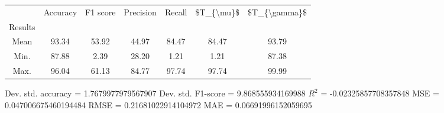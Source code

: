 \begin{tabular}{|c|c|c|c|c|c|c|}
\toprule
{} &  Accuracy &  F1 score &  Precision &  Recall &  \$T\_\{\textbackslash mu\}\$ &  \$T\_\{\textbackslash gamma\}\$ \\
Results &           &           &            &         &            &               \\
\hline
Mean    &     93.34 &     53.92 &      44.97 &   84.47 &      84.47 &         93.79 \\
Min.    &     87.88 &      2.39 &      28.20 &    1.21 &       1.21 &         87.38 \\
Max.    &     96.04 &     61.13 &      84.77 &   97.74 &      97.74 &         99.99 \\
\bottomrule
\end{tabular}

 Dev. std. accuracy = 1.7679977979567907
 Dev. std. F1-score = 9.868555934169988
 $R^2$ = -0.02325857708357848
 MSE = 0.047006675460194484
 RMSE = 0.21681022914104972
 MAE = 0.06691996152059695